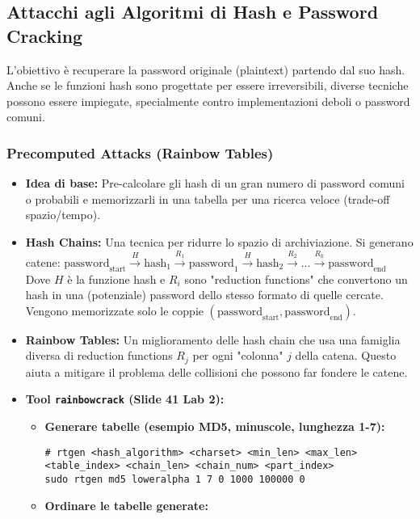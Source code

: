 \subsection{Attacchi agli Algoritmi di Hash e Password Cracking}
L'obiettivo è recuperare la password originale (plaintext) partendo dal suo hash. Anche se le funzioni hash sono progettate per essere irreversibili, diverse tecniche possono essere impiegate, specialmente contro implementazioni deboli o password comuni.

\subsubsection{Precomputed Attacks (Rainbow Tables)}
\begin{itemize}
    \item \textbf{Idea di base:} Pre-calcolare gli hash di un gran numero di password comuni o probabili e memorizzarli in una tabella per una ricerca veloce (trade-off spazio/tempo).
    \item \textbf{Hash Chains:} Una tecnica per ridurre lo spazio di archiviazione. Si generano catene:
    \( \text{password}_{\text{start}} \xrightarrow{H} \text{hash}_1 \xrightarrow{R_1} \text{password}_1 \xrightarrow{H} \text{hash}_2 \xrightarrow{R_2} \dots \xrightarrow{R_k} \text{password}_{\text{end}} \)
    Dove \(H\) è la funzione hash e \(R_i\) sono "reduction functions" che convertono un hash in una (potenziale) password dello stesso formato di quelle cercate. Vengono memorizzate solo le coppie \((\text{password}_{\text{start}}, \text{password}_{\text{end}})\).
    \item \textbf{Rainbow Tables:} Un miglioramento delle hash chain che usa una famiglia diversa di reduction functions \(R_j\) per ogni "colonna" \(j\) della catena. Questo aiuta a mitigare il problema delle collisioni che possono far fondere le catene.
    \item \textbf{Tool \texttt{rainbowcrack} (Slide 41 Lab 2):}
    \begin{itemize}
        \item \textbf{Generare tabelle (esempio MD5, minuscole, lunghezza 1-7):}
\begin{verbatim}
# rtgen <hash_algorithm> <charset> <min_len> <max_len> <table_index> <chain_len> <chain_num> <part_index>
sudo rtgen md5 loweralpha 1 7 0 1000 100000 0
\end{verbatim}
        \item \textbf{Ordinare le tabelle generate:}

\end{itemize}
\end{itemize}
